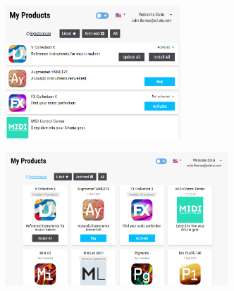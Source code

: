 \documentclass[francais]{rapportPFE}  %
\begin{document}
\begin{center}
    \centering
    \begin{minipage}{.5\textwidth}
    \centering
    \includegraphics[height=5cm]{graphics/small.png}
    \label{fig:test1}
    \end{minipage}%
    \begin{minipage}{.5\textwidth}
    \centering
    \includegraphics[height=5cm]{graphics/big.png}
    \label{fig:test2}
    \end{minipage}
    \end{center}




%
 
 
 
 
\end{document}
